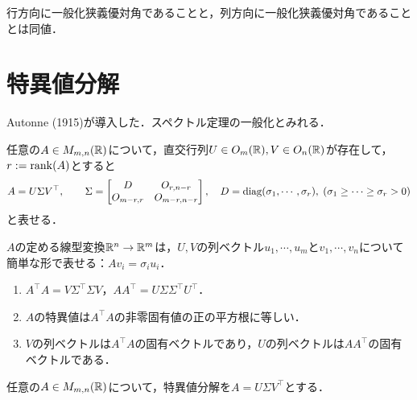 \documentclass[uplatex, dvipdfmx]{jsreport}
\begin{document}
\begin{corollary}
    行方向に一般化狭義優対角であることと，列方向に一般化狭義優対角であることとは同値．
\end{corollary}

\section{特異値分解}

\begin{tcolorbox}[colframe=ForestGreen, colback=ForestGreen!10!white,breakable,colbacktitle=ForestGreen!40!white,coltitle=black,fonttitle=\bfseries\sffamily,
title=]
    Autonne (1915)が導入した．スペクトル定理の一般化とみれる．
\end{tcolorbox}

\begin{theorem}
    任意の$A\in M_{m,n}(\mathbb{R})$について，直交行列$U\in O_m(\mathbb{R}),V\in O_n(\mathbb{R})$が存在して，$r:=\mathrm{rank}(A)$とすると
    \[A=U\Sigma V^\top,\qquad\Sigma=\begin{bmatrix}D&O_{r,n-r}\\O_{m-r,r}&O_{m-r,n-r}\end{bmatrix},\quad D=\mathrm{diag}(\sigma_1,\cdots,\sigma_r),\;(\sigma_1\ge\cdots\ge\sigma_r>0)\]
    と表せる．
\end{theorem}
\begin{remarks}
    $A$の定める線型変換$\mathbb{R}^n\to\mathbb{R}^m$は，$U,V$の列ベクトル$u_1,\cdots,u_m$と$v_1,\cdots,v_n$について簡単な形で表せる：$Av_i=\sigma_iu_i$．
\end{remarks}

\begin{corollary}\mbox{}
    \begin{enumerate}
        \item $A^\top A=V\Sigma^\top\Sigma V$，$AA^\top=U\Sigma\Sigma^\top U^\top$．
        \item $A$の特異値は$A^\top A$の非零固有値の正の平方根に等しい．
        \item $V$の列ベクトルは$A^\top A$の固有ベクトルであり，$U$の列ベクトルは$AA^\top$の固有ベクトルである．
    \end{enumerate}
\end{corollary}

\begin{theorem}[一般化逆行列の公式]
    任意の$A\in M_{m,n}(\mathbb{R})$について，特異値分解を$A=U\Sigma V^\top$とする．
\end{theorem}
\end{document}
